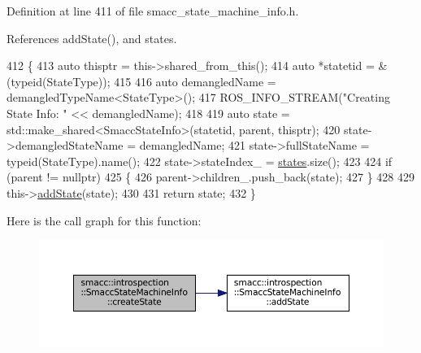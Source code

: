 Definition at line 411 of file smacc\+\_\+state\+\_\+machine\+\_\+info.\+h.



References add\+State(), and states.


\begin{DoxyCode}
412 \{
413     \textcolor{keyword}{auto} thisptr = this->shared\_from\_this();
414     \textcolor{keyword}{auto} *statetid = &(\textcolor{keyword}{typeid}(StateType));
415 
416     \textcolor{keyword}{auto} demangledName = demangledTypeName<StateType>();
417     ROS\_INFO\_STREAM(\textcolor{stringliteral}{"Creating State Info: "} << demangledName);
418 
419     \textcolor{keyword}{auto} state = std::make\_shared<SmaccStateInfo>(statetid, parent, thisptr);
420     state->demangledStateName = demangledName;
421     state->fullStateName = \textcolor{keyword}{typeid}(StateType).name();
422     state->stateIndex\_ = \hyperlink{classsmacc_1_1introspection_1_1SmaccStateMachineInfo_aef31d74ad3669f0b0f57fe0e008cd2f8}{states}.size();
423 
424     \textcolor{keywordflow}{if} (parent != \textcolor{keyword}{nullptr})
425     \{
426         parent->children\_.push\_back(state);
427     \}
428 
429     this->\hyperlink{classsmacc_1_1introspection_1_1SmaccStateMachineInfo_ab4eafccfbba21257405fc4274c2ed22a}{addState}(state);
430 
431     \textcolor{keywordflow}{return} state;
432 \}
\end{DoxyCode}
Here is the call graph for this function\+:
\nopagebreak
\begin{figure}[H]
\begin{center}
\leavevmode
\includegraphics[width=350pt]{classsmacc_1_1introspection_1_1SmaccStateMachineInfo_ad3eacdb32594e603fb36a8ab478d0ce7_cgraph}
\end{center}
\end{figure}
\mbox{\label{classsmacc_1_1introspection_1_1SmaccStateMachineInfo_ab2970707b3eec89f70aba88612ab0ca5}} 
